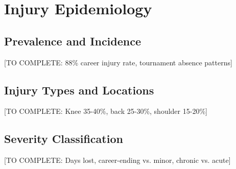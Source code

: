 \section{Injury Epidemiology}

\subsection{Prevalence and Incidence}

[TO COMPLETE: 88\% career injury rate, tournament absence patterns]

\subsection{Injury Types and Locations}

[TO COMPLETE: Knee 35-40\%, back 25-30\%, shoulder 15-20\%]

\subsection{Severity Classification}

[TO COMPLETE: Days lost, career-ending vs. minor, chronic vs. acute]